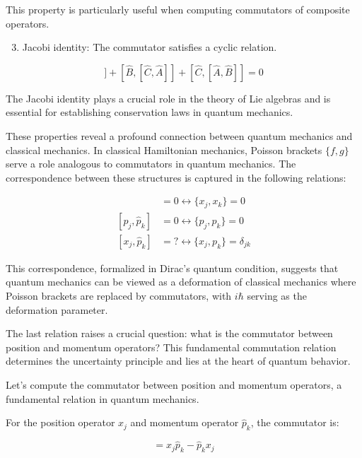 \documentclass[italian]{HKNdocument}
\begin{document}
This property is particularly useful when computing commutators of composite operators.

\begin{enumerate}
  \setcounter{enumi}{2}
  \item Jacobi identity: The commutator satisfies a cyclic relation.
\end{enumerate}

\begin{equation}
[\hat{A},[\hat{B}, \hat{C}]] + [\hat{B},[\hat{C}, \hat{A}]] + [\hat{C},[\hat{A}, \hat{B}]] = 0
\end{equation}

The Jacobi identity plays a crucial role in the theory of Lie algebras and is essential for establishing conservation laws in quantum mechanics.

These properties reveal a profound connection between quantum mechanics and classical mechanics. In classical Hamiltonian mechanics, Poisson brackets $\{f,g\}$ serve a role analogous to commutators in quantum mechanics. The correspondence between these structures is captured in the following relations:

\begin{align}
[x_{j}, x_{k}] &= 0 \longleftrightarrow \{x_{j}, x_{k}\} = 0 \\
[\hat{p}_{j}, \hat{p}_{k}] &= 0 \longleftrightarrow \{p_{j}, p_{k}\} = 0  \\
[x_{j}, \hat{p}_{k}] &= ? \longleftrightarrow \{x_{j}, p_{k}\} = \delta_{j k}
\end{align}

This correspondence, formalized in Dirac's quantum condition, suggests that quantum mechanics can be viewed as a deformation of classical mechanics where Poisson brackets are replaced by commutators, with $i\hbar$ serving as the deformation parameter.

The last relation raises a crucial question: what is the commutator between position and momentum operators? This fundamental commutation relation determines the uncertainty principle and lies at the heart of quantum behavior.


Let's compute the commutator between position and momentum operators, a fundamental relation in quantum mechanics.

For the position operator $x_j$ and momentum operator $\hat{p}_k$, the commutator is:

\begin{equation}
[x_j, \hat{p}_k] = x_j\hat{p}_k - \hat{p}_k x_j
\end{equation}
\end{document}
